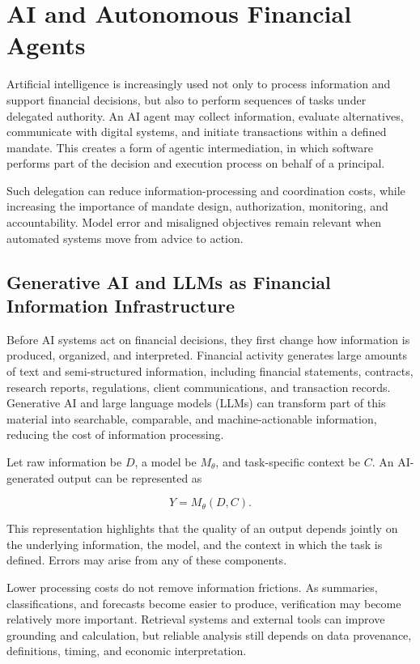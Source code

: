 \section{AI and Autonomous Financial Agents}

Artificial intelligence is increasingly used not only to process information and support financial decisions, but also to perform sequences of tasks under delegated authority. An AI agent may collect information, evaluate alternatives, communicate with digital systems, and initiate transactions within a defined mandate. This creates a form of agentic intermediation, in which software performs part of the decision and execution process on behalf of a principal.

Such delegation can reduce information-processing and coordination costs, while increasing the importance of mandate design, authorization, monitoring, and accountability. Model error and misaligned objectives remain relevant when automated systems move from advice to action.

\subsection{Generative AI and LLMs as Financial Information Infrastructure}

Before AI systems act on financial decisions, they first change how information is produced, organized, and interpreted. Financial activity generates large amounts of text and semi-structured information, including financial statements, contracts, research reports, regulations, client communications, and transaction records. Generative AI and large language models (LLMs) can transform part of this material into searchable, comparable, and machine-actionable information, reducing the cost of information processing.

Let raw information be \(D\), a model be \(M_{\theta}\), and task-specific context be \(C\). An AI-generated output can be represented as

\begin{equation}
Y=M_{\theta}(D,C).
\label{eq:ch24-ai-information-output}
\end{equation}

This representation highlights that the quality of an output depends jointly on the underlying information, the model, and the context in which the task is defined. Errors may arise from any of these components.

Lower processing costs do not remove information frictions. As summaries, classifications, and forecasts become easier to produce, verification may become relatively more important. Retrieval systems and external tools can improve grounding and calculation, but reliable analysis still depends on data provenance, definitions, timing, and economic interpretation.

